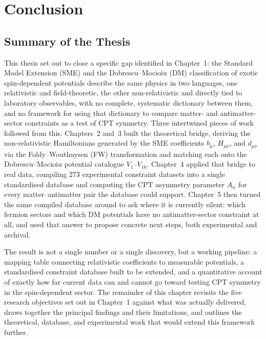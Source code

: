 \documentclass[main]{subfiles}
\begin{document}
\ifSubfilesClassLoaded{\setcounter{chapter}{5}}{}
\chapter{Conclusion}

\section{Summary of the Thesis}

This thesis set out to close a specific gap identified in Chapter~1: the
Standard Model Extension (SME) and the Dobrescu--Mocioiu (DM) classification
of exotic spin-dependent potentials describe the same physics in two
languages, one relativistic and field-theoretic, the other
non-relativistic and directly tied to laboratory observables, with no
complete, systematic dictionary between them, and no framework for using
that dictionary to compare matter- and antimatter-sector constraints as a
test of CPT symmetry. Three intertwined pieces of work followed from this.
Chapters~2 and~3 built the theoretical bridge, deriving the
non-relativistic Hamiltonians generated by the SME coefficients $b_\mu$,
$H_{\mu\nu}$, and $d_{\mu\nu}$ via the Foldy--Wouthuysen (FW) transformation
and matching each onto the Dobrescu--Mocioiu potential catalogue
$V_1$--$V_{16}$. Chapter~4 applied that bridge to real data, compiling 273
experimental constraint datasets into a single standardised database and
computing the CPT asymmetry parameter $A_\alpha$ for every
matter--antimatter pair the database could support. Chapter~5 then turned
the same compiled database around to ask where it is currently silent:
which fermion sectors and which DM potentials have no antimatter-sector
constraint at all, and used that answer to propose concrete next steps,
both experimental and archival.

The result is not a single number or a single discovery, but a working
pipeline: a mapping table connecting relativistic coefficients to
measurable potentials, a standardised constraint database built to be
extended, and a quantitative account of exactly how far current data can
and cannot go toward testing CPT symmetry in the spin-dependent sector.
The remainder of this chapter revisits the five research objectives set out
in Chapter~1 against what was actually delivered, draws together the
principal findings and their limitations, and outlines the theoretical,
database, and experimental work that would extend this framework further.
\end{document}
